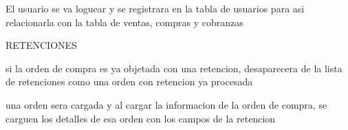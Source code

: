 El usuario se va loguear y se registrara en la tabla de usuarios para asi relacionarla con la tabla de
ventas, compras y cobranzas 


RETENCIONES 

si la orden de compra es ya objetada con una retencion, desaparecera de la lista de retenciones como una 
orden con retencion ya procesada 


una orden sera cargada y al cargar la informacion de la orden de compra, se carguen los detalles de esa
orden con los campos de la retencion 

